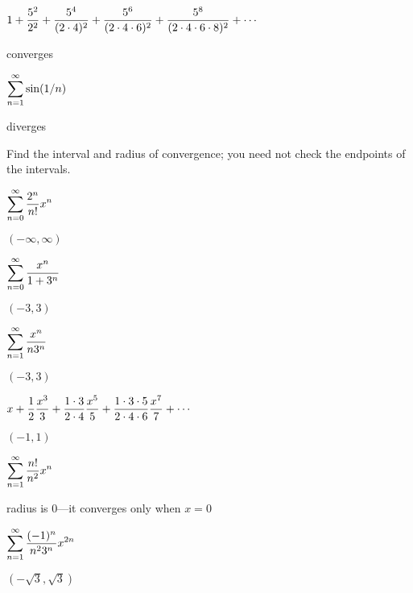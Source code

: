 \begin{exercises}
\begin{exercise} $\displaystyle 1+ {5^2\over 2^2}+{5^4\over (2\cdot4)^2}
 +{5^6\over(2\cdot4\cdot6)^2}+ {5^8\over(2\cdot4\cdot6\cdot8)^2}+\cdots$
\begin{answer} converges
\end{answer}\end{exercise}

\begin{exercise} $\displaystyle \sum_{n=1}^\infty \sin(1/n)$
\begin{answer} diverges
\end{answer}\end{exercise}

\vskip50pt\vskip-50pt
\msk\noindent
Find the interval and radius of convergence; you need not check the
endpoints of the intervals.

\begin{exercise} $\displaystyle\sum_{n=0}^\infty {2^n\over n!}x^n$
\begin{answer} $(-\infty,\infty)$
\end{answer}\end{exercise}

\begin{exercise} $\displaystyle\sum_{n=0}^\infty {x^n\over 1+3^n}$
\begin{answer} $(-3,3)$
\end{answer}\end{exercise}

\begin{exercise} $\displaystyle\sum_{n=1}^\infty {x^n\over n3^n}$
\begin{answer} $(-3,3)$
\end{answer}\end{exercise}

\begin{exercise} $\displaystyle x+{1\over 2}{x^3\over3} + {1\cdot 3\over 2\cdot4}{x^5\over5}+
{1\cdot 3\cdot5\over 2\cdot4\cdot6}{x^7\over7}+\cdots$
\begin{answer} $(-1,1)$
\end{answer}\end{exercise}

\begin{exercise} $\displaystyle\sum_{n=1}^\infty {n!\over n^2} x^n$
\begin{answer} radius is $0$---it converges only when $x=0$
\end{answer}\end{exercise}

\begin{exercise} $\displaystyle\sum_{n=1}^\infty {(-1)^n\over n^2 3^n} x^{2n}$
\begin{answer} $(-\sqrt3,\sqrt3)$
\end{answer}\end{exercise}


\end{exercises}
